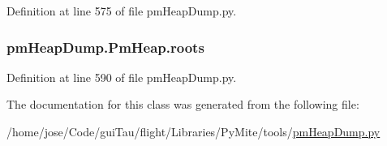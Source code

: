Definition at line 575 of file pm\-Heap\-Dump.\-py.

\hypertarget{classpm_heap_dump_1_1_pm_heap_a81d16782513bb112bc8de10f351f004e}{
\subsubsection[{roots}]{\setlength{\rightskip}{0pt plus 5cm}pm\-Heap\-Dump.\-Pm\-Heap.\-roots}}\label{classpm_heap_dump_1_1_pm_heap_a81d16782513bb112bc8de10f351f004e}


Definition at line 590 of file pm\-Heap\-Dump.\-py.



The documentation for this class was generated from the following file\-:\begin{DoxyCompactItemize}
\item 
/home/jose/\-Code/gui\-Tau/flight/\-Libraries/\-Py\-Mite/tools/\hyperlink{pm_heap_dump_8py}{pm\-Heap\-Dump.\-py}\end{DoxyCompactItemize}
